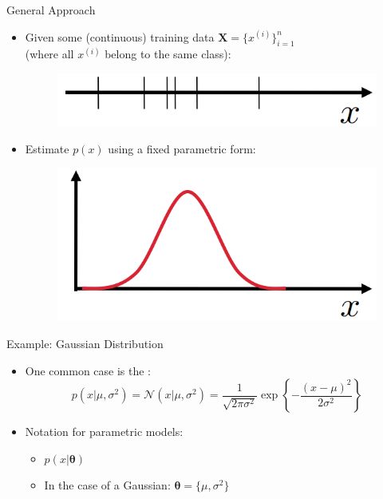 \begin{frame}{General Approach}{}
	\begin{itemize}
		\item Given some (continuous) training data $\bm{X} = \{ x^{(i)} \}_{i=1}^n$ \\
			(where all $x^{(i)}$ belong to the same class):
		\vspace*{4mm}
		\begin{figure}
			\centering
			\includegraphics[scale=0.3]{04_density_estimation/02_img/pde_data_1d}
		\end{figure}
		\item Estimate $p(x)$ using a fixed parametric form:
		\vspace*{2mm}
		\begin{figure}
			\centering
			\includegraphics[scale=0.3]{04_density_estimation/02_img/pde_result_1d}
		\end{figure}
	\end{itemize}
\end{frame}


\begin{frame}{Example: Gaussian Distribution}{}
	\begin{itemize}
		\item One common case is the :
		\begin{equation}
			p(x \vert \mu, \sigma^2) = \mathcal{N}(x \vert \mu, \sigma^2) = \frac{1}{\sqrt{2 \pi \sigma^2}}
				\exp\left\{ -\frac{(x - \mu)^2}{2 \sigma^2} \right\}
		\end{equation}
		\item Notation for parametric models:
		\begin{itemize}
			\item $p(x \vert \bm{\theta})$
			\item In the case of a Gaussian: $\bm{\theta} = \{ \mu, \sigma^2 \}$
		\end{itemize}
	\end{itemize}
\end{frame}


